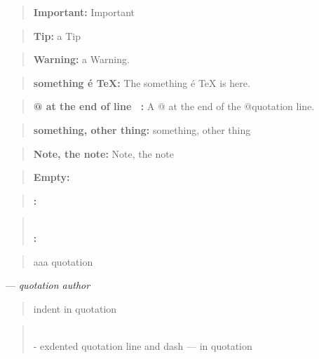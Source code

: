 \documentclass{book}
\begin{document}
\begin{quote}
\textbf{Important:} Important
\end{quote}

\begin{quote}
\textbf{Tip:} a Tip
\end{quote}

\begin{quote}
\textbf{Warning:} a Warning.
\end{quote}

\begin{quote}
\textbf{something \'{e} \TeX{}:} The something \'{e} \TeX{} is here.
\end{quote}

\begin{quote}
\textbf{@ at the end of line \ {}:} A @ at the end of the @quotation line.
\end{quote}

\begin{quote}
\textbf{something, other thing:} something, other thing
\end{quote}

\begin{quote}
\textbf{Note, the note:} Note, the note
\end{quote}

\begin{quote}
\end{quote}

\begin{quote}
\textbf{Empty:} \end{quote}

\begin{quote}
\textbf{:} \end{quote}

\begin{quote}
\textbf{\leavevmode{}\\:} \end{quote}

\begin{quote}
aaa quotation
\end{quote}
\begin{center}
--- \emph{quotation author}
\end{center}

\begin{quote}
indent in quotation
\end{quote}

\begin{quote}
\\
\hbox{\kern -\leftmargin}%
exdented quotation line   and dash --- in quotation
\\
\end{quote}
\end{document}
